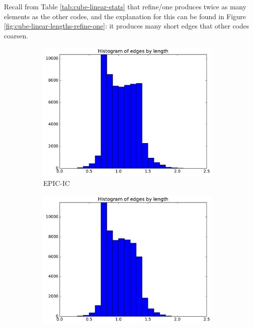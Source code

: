 \documentclass[3p,times,procedia,number]{elsarticle}
\begin{document}
Recall from Table \ref{tab:cube-linear-stats} that refine/one produces
twice as many elements as the other codes, and the explanation for this can be
found in Figure \ref{fig:cube-linear-lengths-refine-one}:
it produces many short edges that other codes coarsen.

\begin{figure}
\begin{subfigure}{.16\textwidth}
\centering
\includegraphics[width=\textwidth]{epic-ic-cube-linear-length.pdf}
\caption{EPIC-IC}
\end{subfigure}
\begin{subfigure}{.16\textwidth}
\centering
\includegraphics[width=\textwidth]{epic-ics-cube-linear-length.pdf}

\end{subfigure}
\end{figure}
\end{document}
